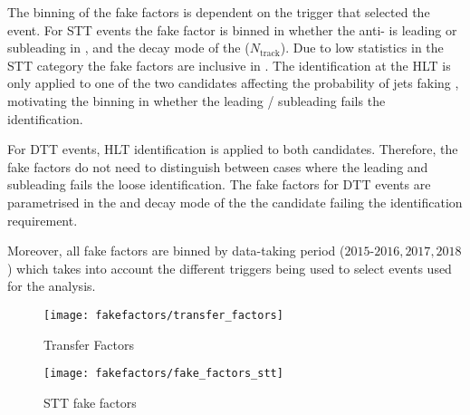 The binning of the fake factors is dependent on the trigger that selected the
event. For STT events the fake factor is binned in whether the anti-\tauhadvis
is leading or subleading in \pT, and the decay mode of the \tauhadvis
($N_\text{track}$). Due to low statistics in the STT category the fake factors
are inclusive in \tauhadvis \pT. The \tauhadvis identification at the HLT is
only applied to one of the two \tauhadvis candidates affecting the probability
of jets faking \tauhadvis, motivating the binning in whether the leading /
subleading \tauhadvis fails the identification.

For DTT events, HLT \tauhadvis identification is applied to both \tauhadvis
candidates. Therefore, the fake factors do not need to distinguish between cases
where the leading and subleading \tauhadvis fails the loose identification. The
fake factors for DTT events are parametrised in the \pT and decay mode of the
the \tauhadvis candidate failing the identification requirement.

Moreover, all fake factors are binned by data-taking period (${\text{2015-2016},
  \text{2017}, \text{2018}}$) which takes into account the different triggers
being used to select events used for the analysis.





\begin{figure}[htbp]
  \centering

  \texttt{[image: fakefactors/transfer\_factors]}

  \caption{Transfer Factors}
  \label{fig:mjfakes_transfer_factor}
\end{figure}

\begin{figure}[htbp]
  \centering

  \texttt{[image: fakefactors/fake\_factors\_stt]}


  \caption{STT fake factors}
  \label{fig:mjfakes_stt_ffs}
\end{figure}


